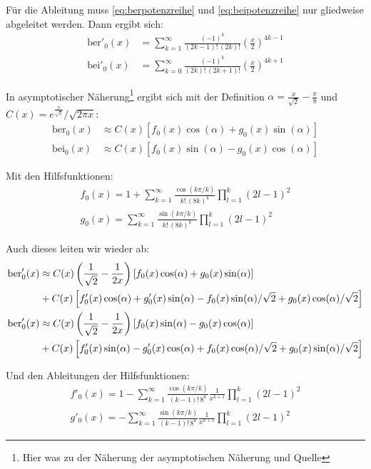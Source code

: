 \documentclass[10pt,a4paper]{article}
\begin{document}
Für die Ableitung muss \ref{eq:berpotenzreihe} und \ref{eq:beipotenzreihe} nur gliedweise abgeleitet werden.
Dann ergibt sich:
\begin{align}
	\mathrm{ber}'_0(x) &= \sum^{\infty}_{k=1} \frac{\left( -1 \right)^k}{\left( 2k-1 \right)! \, \left( 2k \right)!} \left( \frac{x}{2} \right)^{4k-1}\\
	\mathrm{bei}'_0(x) &= \sum^{\infty}_{k=0} \frac{\left( -1 \right)^k}{\left( 2k \right)! \, \left( 2k+1 \right)!} \left( \frac{x}{2} \right)^{4k+1}
\end{align}

In asymptotischer Näherung\footnote{Hier was zu der Näherung der asymptotischen Näherung und Quelle} ergibt sich mit der Definition $\alpha = \frac{x}{\sqrt{2}}-\frac{\pi}{8}$ und $C(x) = e^{\frac{x}{\sqrt{2}}}/\sqrt{2 \pi x} $:
\begin{align}
	\mathrm{ber}_0(x) &\approx C(x) \left[f_0(x) \cos(\alpha) + g_0(x) \sin(\alpha) \right]\label{eq:berpotenzreiheasym}\\
	\mathrm{bei}_0(x) &\approx C(x) \left[f_0(x) \sin(\alpha) - g_0(x) \cos(\alpha) \right]\label{eq:beipotenzreiheasym}
\end{align}

Mit den Hilfsfunktionen:
\begin{align}
  f_0(x) = 1 + \sum^{\infty}_{k=1} \frac{\cos(k \pi / k)}{k! \, (8k)^k} \prod^{k}_{l=1}(2l - 1)^2\\
  g_0(x) = \sum^{\infty}_{k=1} \frac{\sin(k \pi / k)}{k! \, (8k)^k} \prod^{k}_{l=1}(2l - 1)^2
\end{align}

Auch dieses leiten wir wieder ab:
\begin{align}
	\mathrm{ber}'_0(x) &\approx C(x) \left( \frac{1}{\sqrt{2}} - \frac{1}{2x} \right) \left[f_0(x) \cos(\alpha) + g_0(x) \sin(\alpha) \right] \notag\\ & + C(x) \left[ f'_0(x) \cos(\alpha) + g'_0(x) \sin(\alpha) - f_0(x) \sin(\alpha)/\sqrt{2} + g_0(x) \cos(\alpha)/\sqrt{2} \right]\label{eq:dberpotenzreiheasym}\\
	\mathrm{ber}'_0(x) &\approx C(x) \left( \frac{1}{\sqrt{2}} - \frac{1}{2x} \right) \left[f_0(x) \sin(\alpha) - g_0(x) \cos(\alpha) \right] \notag\\ & + C(x) \left[ f'_0(x) \sin(\alpha) - g'_0(x) \cos(\alpha) + f_0(x) \cos(\alpha)/\sqrt{2} + g_0(x) \sin(\alpha)/\sqrt{2} \right] \label{eq:dbeipotenzreiheasym}
\end{align}

Und den Ableitungen der Hilfsfunktionen:
\begin{align}
  f'_0(x) = 1 - \sum^{\infty}_{k=1} \frac{\cos(k \pi / k)}{(k-1)! \, 8^k} \frac{1}{x^{k+1}} \prod^{k}_{l=1}(2l - 1)^2\\
  g'_0(x) = -\sum^{\infty}_{k=1} \frac{\sin(k \pi / k)}{(k-1)! \, 8^k} \frac{1}{x^{k+1}} \prod^{k}_{l=1}(2l - 1)^2
\end{align}
\end{document}
